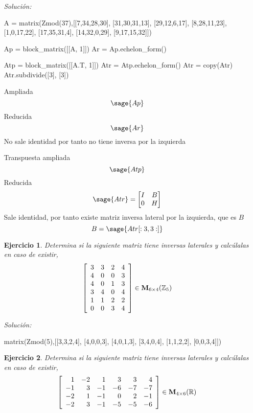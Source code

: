 \documentclass{amsart}
\newtheorem{ejer}{Ejercicio}
\begin{document}
{\it Soluci\'on:}

\begin{sageblock}
A = matrix(Zmod(37),[[7,34,28,30],
[31,30,31,13],
[29,12,6,17],
[8,28,11,23],
[1,0,17,22],
[17,35,31,4],
[14,32,0,29],
[9,17,15,32]])

Ap = block_matrix([[A, 1]])
Ar = Ap.echelon_form()

Atp = block_matrix([[A.T, 1]])
Atr = Atp.echelon_form()
Atr = copy(Atr)
Atr.subdivide([3], [3])
\end{sageblock}

Ampliada
$$
	\sage{Ap}
$$
Reducida
$$
	\sage{Ar}
$$
No sale identidad por tanto no tiene inversa por la izquierda

Transpuesta ampliada
$$
	\sage{Atp}
$$
Reducida
$$
	\sage{Atr} = \begin{bmatrix}
		I & B \\
		0 & H \\
	\end{bmatrix}
$$
Sale identidad, por tanto existe matriz inversa lateral por la izquierda, que es $B$
$$
	B = \sage{Atr[:3, 3:]}
$$




\begin{ejer} Determina si la siguiente matriz tiene inversas laterales y calc\'ulalas en caso de existir,
\[ \left[\begin{array}{rrrr}
3 & 3 & 2 & 4 \\
4 & 0 & 0 & 3 \\
4 & 0 & 1 & 3 \\
3 & 4 & 0 & 4 \\
1 & 1 & 2 & 2 \\
0 & 0 & 3 & 4
\end{array}\right] \in {\bf M}_{6\times 4}({\mathbb Z}_{5})\]
\end{ejer}

{\it Soluci\'on:}

\begin{sageblock}
matrix(Zmod(5),[[3,3,2,4],
[4,0,0,3],
[4,0,1,3],
[3,4,0,4],
[1,1,2,2],
[0,0,3,4]])
\end{sageblock}



\begin{ejer} Determina si la siguiente matriz tiene inversas laterales y calc\'ulalas en caso de existir,
\[ \left[\begin{array}{rrrrrr}
1 & -2 & 1 & 3 & 3 & 4 \\
-1 & 3 & -1 & -6 & -7 & -7 \\
-2 & 1 & -1 & 0 & 2 & -1 \\
-2 & 3 & -1 & -5 & -5 & -6
\end{array}\right] \in {\bf M}_{4\times 6}({\mathbb R})\]
\end{ejer}
\end{document}
